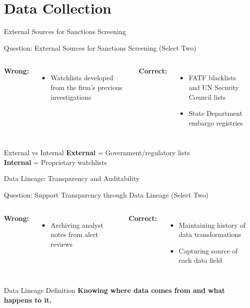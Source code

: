 \documentclass{beamer}
\begin{document}
\section{Data Collection}
\begin{frame}{External Sources for Sanctions Screening}
\begin{block}{Question: External Sources for Sanctions Screening (Select Two)}
\end{block}

\begin{columns}
\textcolor{wrong}{\textbf{ Wrong:}}
\begin{itemize}
    \item Watchlists developed from the firm's previous investigations
\end{itemize}

\textcolor{correct}{\textbf{Correct:}}
\begin{itemize}
    \item FATF blacklists and UN Security Council lists
    \item State Department embargo registries
\end{itemize}
\end{columns}

\begin{block}{External vs Internal}
\textbf{External} = Government/regulatory lists \\
\textbf{Internal} = Proprietary watchlists
\end{block}
\end{frame}

\begin{frame}{Data Lineage: Transparency and Auditability}
\begin{block}{Question: Support Transparency through Data Lineage (Select Two)}
\end{block}

\begin{columns}
\textcolor{wrong}{\textbf{ Wrong:}}
\begin{itemize}
    \item Archiving analyst notes from alert reviews
\end{itemize}

\textcolor{correct}{\textbf{Correct:}}
\begin{itemize}
    \item Maintaining history of data transformations
    \item Capturing source of each data field
\end{itemize}
\end{columns}

\begin{block}{Data Lineage Definition}
\textbf{Knowing where data comes from and what happens to it.}
\end{block}
\end{frame}
\end{document}
